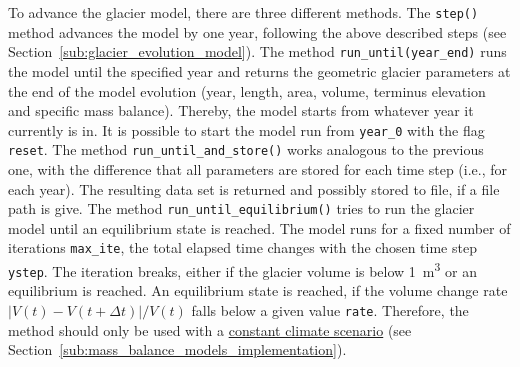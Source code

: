         To advance the glacier model, there are three different methods. The \lstinline`step()` method advances the model by one year, following the above described steps (see Section~\ref{sub:glacier_evolution_model}). The method \lstinline`run_until(year_end)` runs the model until the specified year and returns the geometric glacier parameters at the end of the model evolution (year, length, area, volume, terminus elevation and specific mass balance). Thereby, the model starts from whatever year it currently is in. It is possible to start the model run from \lstinline`year_0` with the flag \lstinline`reset`. The method \lstinline`run_until_and_store()` works analogous to the previous one, with the difference that all parameters are stored for each time step (i.e., for each year). The resulting data set is returned and possibly stored to file, if a file path is give. The method \lstinline`run_until_equilibrium()` tries to run the glacier model until an equilibrium state is reached. The model runs for a fixed number of iterations \lstinline`max_ite`, the total elapsed time changes with the chosen time step \lstinline`ystep`. The iteration breaks, either if the glacier volume is below \SI{1}{\cubic\meter} or an equilibrium is reached. An equilibrium state is reached, if the volume change rate $|V(t) - V(t+\Delta t)|/V(t)$ falls below a given value \lstinline`rate`. Therefore, the method should only be used with a \hyperref[ssub:constant_climate_scenario_implementation]{constant climate scenario} (see Section~\ref{sub:mass_balance_models_implementation}).
    

